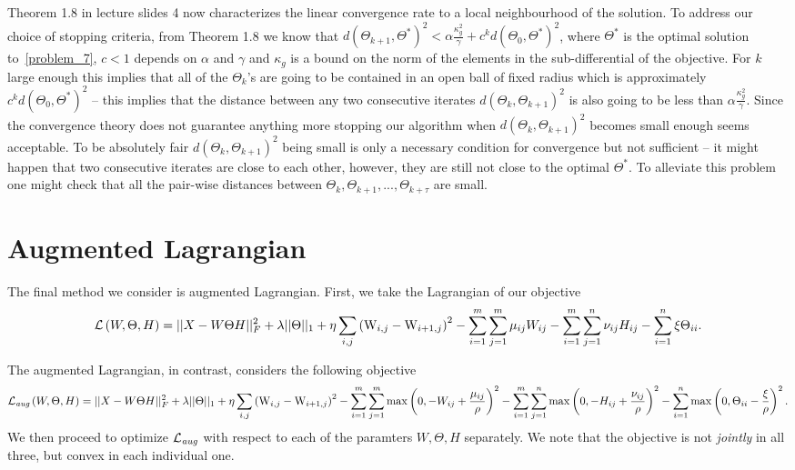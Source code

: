 \documentclass{article}
\newcommand{\0}{\mathrm{0}}
\newcommand{\1}{\mathrm{1}}
\newcommand{\W}{\mathrm{W}}
\begin{document}
Theorem 1.8 in lecture slides 4 now characterizes the linear convergence rate to a local neighbourhood of the solution. To address our choice of stopping criteria, from Theorem 1.8 we know that  $d(\Theta_{k+1},\Theta^*)^2 < \alpha\frac{\kappa_g^2}{\gamma} + c^kd(\Theta_0,\Theta^*)^2$, where $\Theta^*$ is the optimal solution to~\ref{problem_7}, $c<1$ depends on $\alpha$ and $\gamma$ and $\kappa_g$ is a bound on the norm of the elements in the sub-differential of the objective. For $k$ large enough this implies that all of the $\Theta_{k}$'s are going to be contained in an open ball of fixed radius which is approximately $c^kd(\Theta_0,\Theta^*)^2$ -- this implies that the distance between any two consecutive iterates $d(\Theta_k,\Theta_{k+1})^2$ is also going to be less than $\alpha\frac{\kappa_g^2}{\gamma}$. Since the convergence theory does not guarantee anything more stopping our algorithm when $d(\Theta_k,\Theta_{k+1})^2$ becomes small enough seems acceptable. To be absolutely fair $d(\Theta_k,\Theta_{k+1})^2$ being small is only a necessary condition for convergence but not sufficient -- it might happen that two consecutive iterates are close to each other, however, they are still not close to the optimal $\Theta^*$. To alleviate this problem one might check that all the pair-wise distances between $\Theta_k,\Theta_{k+1},...,\Theta_{k+\tau}$ are small.

\section{Augmented Lagrangian}

The final method we consider is augmented Lagrangian. First, we take the Lagrangian
of our objective
\begin{equation}
  \begin{aligned}
  {\cal L}\left(W, \Theta, H\right) = ||X - W\Theta H||_F^2 + \lambda ||\Theta||_1 + \eta\sum_{i,j}\left(\W_{i,j} - \W_{i+1,j}\right)^2 - \sum_{i=1}^m \sum_{j=1}^m \mu_{ij} W_{ij} - \sum_{i=1}^m \sum_{j=1}^n \nu_{ij} H_{ij} - \sum_{i=1}^n \xi \Theta_{ii}.
  \end{aligned}
\end{equation}

The augmented Lagrangian, in contrast, considers the following objective
{\tiny
\begin{equation}
  \begin{aligned}
  {\cal L}_{\textit{aug}}\left(W, \Theta, H\right) = ||X - W\Theta H||_F^2 + \lambda ||\Theta||_1 + \eta\sum_{i,j}\left(\W_{i,j} - \W_{i+1,j}\right)^2 - \sum_{i=1}^m \sum_{j=1}^m \max\left(0, -W_{ij} + \frac{\mu_{ij}}{\rho}\right)^2  - \sum_{i=1}^m \sum_{j=1}^n \max\left(0, -H_{ij} + \frac{\nu_{ij}}{\rho} \right)^2 - \sum_{i=1}^n \max\left(0, \Theta_{ii} - \frac{\xi}{\rho}\right)^2.
  \end{aligned}
\end{equation}
}
We then proceed to optimize ${\cal L}_{\textit{aug}}$ with
respect to each of the paramters $W, \Theta, H$ separately. We note
that the objective is not {\em jointly} in all three, but convex in
each individual one.
\end{document}
